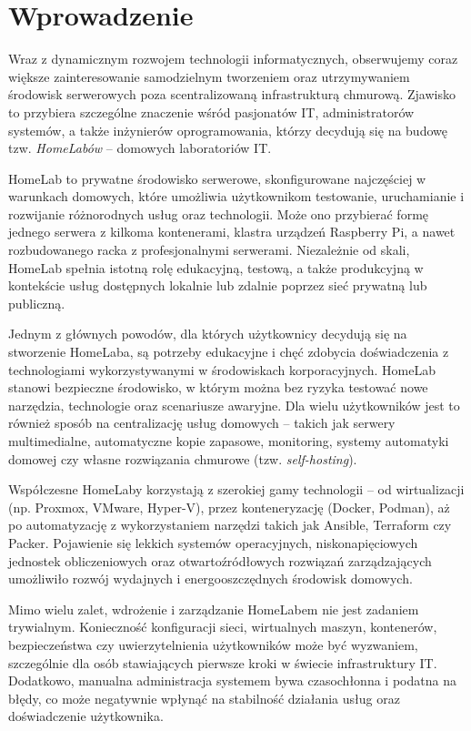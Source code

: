 \chapter{Wprowadzenie}

Wraz z dynamicznym rozwojem technologii informatycznych, obserwujemy coraz większe zainteresowanie samodzielnym tworzeniem oraz utrzymywaniem środowisk serwerowych poza scentralizowaną infrastrukturą chmurową. Zjawisko to przybiera szczególne znaczenie wśród pasjonatów IT, administratorów systemów, a także inżynierów oprogramowania, którzy decydują się na budowę tzw. \textit{HomeLabów} – domowych laboratoriów IT. 

HomeLab to prywatne środowisko serwerowe, skonfigurowane najczęściej w warunkach domowych, które umożliwia użytkownikom testowanie, uruchamianie i rozwijanie różnorodnych usług oraz technologii. Może ono przybierać formę jednego serwera z kilkoma kontenerami, klastra urządzeń Raspberry Pi, a nawet rozbudowanego racka z profesjonalnymi serwerami. Niezależnie od skali, HomeLab spełnia istotną rolę edukacyjną, testową, a także produkcyjną w kontekście usług dostępnych lokalnie lub zdalnie poprzez sieć prywatną lub publiczną.

Jednym z głównych powodów, dla których użytkownicy decydują się na stworzenie HomeLaba, są potrzeby edukacyjne i chęć zdobycia doświadczenia z technologiami wykorzystywanymi w środowiskach korporacyjnych. HomeLab stanowi bezpieczne środowisko, w którym można bez ryzyka testować nowe narzędzia, technologie oraz scenariusze awaryjne. Dla wielu użytkowników jest to również sposób na centralizację usług domowych – takich jak serwery multimedialne, automatyczne kopie zapasowe, monitoring, systemy automatyki domowej czy własne rozwiązania chmurowe (tzw. \textit{self-hosting}).

Współczesne HomeLaby korzystają z szerokiej gamy technologii – od wirtualizacji (np. Proxmox, VMware, Hyper-V), przez konteneryzację (Docker, Podman), aż po automatyzację z wykorzystaniem narzędzi takich jak Ansible, Terraform czy Packer. Pojawienie się lekkich systemów operacyjnych, niskonapięciowych jednostek obliczeniowych oraz otwartoźródłowych rozwiązań zarządzających umożliwiło rozwój wydajnych i energooszczędnych środowisk domowych.

Mimo wielu zalet, wdrożenie i zarządzanie HomeLabem nie jest zadaniem trywialnym. Konieczność konfiguracji sieci, wirtualnych maszyn, kontenerów, bezpieczeństwa czy uwierzytelnienia użytkowników może być wyzwaniem, szczególnie dla osób stawiających pierwsze kroki w świecie infrastruktury IT. Dodatkowo, manualna administracja systemem bywa czasochłonna i podatna na błędy, co może negatywnie wpłynąć na stabilność działania usług oraz doświadczenie użytkownika.

